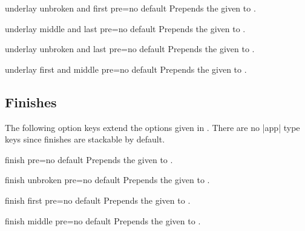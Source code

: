 \begin{docTcbKey}{underlay unbroken and first pre}{=}{no default}
  Prepends the given  to .
\end{docTcbKey}

\begin{docTcbKey}{underlay middle and last pre}{=}{no default}
  Prepends the given  to .
\end{docTcbKey}

\begin{docTcbKey}{underlay unbroken and last pre}{=}{no default}
  Prepends the given  to .
\end{docTcbKey}

\begin{docTcbKey}[][doc new=2014-09-19]{underlay first and middle pre}{=}{no default}
  Prepends the given  to .
\end{docTcbKey}


\clearpage
\subsection{Finishes}
The following option keys extend the options given in .
There are no |app| type keys since finishes are stackable by default.


\begin{docTcbKey}{finish pre}{=}{no default}
  Prepends the given  to .
\end{docTcbKey}

\begin{docTcbKey}{finish unbroken pre}{=}{no default}
  Prepends the given  to .
\end{docTcbKey}

\begin{docTcbKey}{finish first pre}{=}{no default}
  Prepends the given  to .
\end{docTcbKey}

\begin{docTcbKey}{finish middle pre}{=}{no default}
  Prepends the given  to .
\end{docTcbKey}

